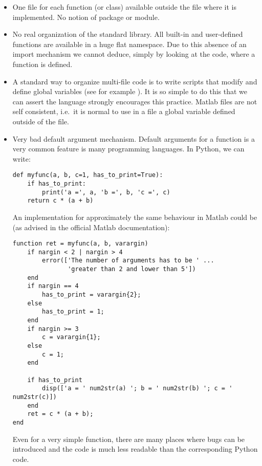 \begin{itemize}
\item One file for each function (or class) available outside the file where it
is implemented. No notion of package or module.

\item No real organization of the standard library. All built-in and
user-defined functions are available in a huge flat namespace. Due to this
absence of an import mechanism we cannot deduce, simply by looking at the code,
where a function is defined.

\item A standard way to organize multi-file code is to write scripts that
modify and define global variables (see for example
).  It is so simple to do this that we
can assert the language strongly encourages this practice.  Matlab files are
not self consistent, i.e.\ it is normal to use in a file a global variable
defined outside of the file.

\item Very bad default argument mechanism.
%
Default arguments for a function is a very common feature is many programming
languages. In Python, we can write:
\begin{verbatim}
def myfunc(a, b, c=1, has_to_print=True):
    if has_to_print:
        print('a =', a, 'b =', b, 'c =', c)
    return c * (a + b)
\end{verbatim}
%
An implementation for approximately the same behaviour in Matlab could be (as
advised in the official Matlab documentation):
\begin{verbatim}
function ret = myfunc(a, b, varargin)
    if nargin < 2 | nargin > 4
        error(['The number of arguments has to be ' ...
               'greater than 2 and lower than 5'])
    end
    if nargin == 4
        has_to_print = varargin{2};
    else
        has_to_print = 1;
    end
    if nargin >= 3
        c = varargin{1};
    else
        c = 1;
    end

    if has_to_print
        disp(['a = ' num2str(a) '; b = ' num2str(b) '; c = ' num2str(c)])
    end
    ret = c * (a + b);
end
\end{verbatim}
Even for a very simple function, there are many places where bugs can be
introduced and the code is much less readable than the corresponding Python
code.


\end{itemize}
